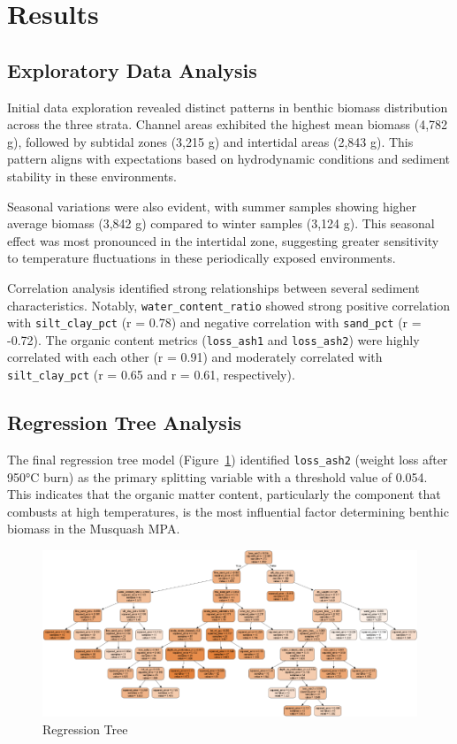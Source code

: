 \documentclass[12pt]{article}
\begin{document}
\newpage
\section{Results}
\subsection{Exploratory Data Analysis}

\qquad Initial data exploration revealed distinct patterns in benthic biomass
distribution across the three strata. Channel areas exhibited the highest mean
biomass (4,782 g), followed by subtidal zones (3,215 g) and intertidal areas
(2,843 g). This pattern aligns with expectations based on hydrodynamic
conditions and sediment stability in these environments.

\qquad Seasonal variations were also evident, with summer samples showing higher
average biomass (3,842 g) compared to winter samples (3,124 g). This seasonal
effect was most pronounced in the intertidal zone, suggesting greater
sensitivity to temperature fluctuations in these periodically exposed
environments.

\qquad Correlation analysis identified strong relationships between several
sediment characteristics. Notably, \texttt{water\_content\_ratio} showed strong
positive correlation with \texttt{silt\_clay\_pct} (r = 0.78) and negative
correlation with \texttt{sand\_pct} (r = -0.72). The organic content metrics
(\texttt{loss\_ash1} and \texttt{loss\_ash2}) were highly correlated with each
other (r = 0.91) and moderately correlated with \texttt{silt\_clay\_pct} (r =
0.65 and r = 0.61, respectively).

\subsection{Regression Tree Analysis}

The final regression tree model (Figure~\ref{fig:regression-tree}) identified
\texttt{loss\_ash2} (weight loss after 950°C burn) as the primary splitting
variable with a threshold value of 0.054. This indicates that the organic matter
content, particularly the component that combusts at high temperatures, is the
most influential factor determining benthic biomass in the Musquash MPA.

\begin{figure}[H]
\centering
\includegraphics[scale=1]{Regression-tree}
\caption{Regression Tree}
\label{fig:regression-tree}
\end{figure}
\end{document}
